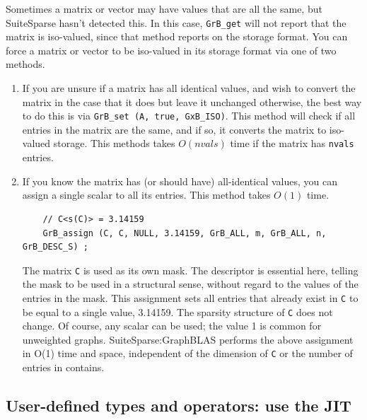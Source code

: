 Sometimes a matrix or vector may have values that are all the same, but
SuiteSparse hasn't detected this.  In this case, \verb'GrB_get' will not report
that the matrix is iso-valued, since that method reports on the storage format.
You can force a matrix or vector to be iso-valued in its storage format via one
of two methods.

\begin{enumerate}

\item If you are unsure if a matrix has all identical values, and wish to convert
the matrix in the case that it does but leave it unchanged otherwise,
the best way to do this is via \verb'GrB_set (A, true, GxB_ISO)'.
This method will check if all entries in the matrix are the same, and if so,
it converts the matrix to iso-valued storage.  This methods takes $O(nvals)$
time if the matrix has \verb'nvals' entries.

\item If you know the matrix has (or should have) all-identical values,
you can assign a single scalar to all its entries.  This method takes
$O(1)$ time.

    {\footnotesize
    \begin{verbatim}
    // C<s(C)> = 3.14159
    GrB_assign (C, C, NULL, 3.14159, GrB_ALL, m, GrB_ALL, n, GrB_DESC_S) ; \end{verbatim}}

The matrix \verb'C' is used as its own mask.  The descriptor is essential here,
telling the mask to be used in a structural sense, without regard to the values
of the entries in the mask.  This assignment sets all entries that already
exist in \verb'C' to be equal to a single value, 3.14159. The sparsity
structure of \verb'C' does not change.  Of course, any scalar can be used; the
value 1 is common for unweighted graphs.  SuiteSparse:GraphBLAS performs the
above assignment in O(1) time and space, independent of the dimension of
\verb'C' or the number of entries in contains.

\end{enumerate}

\subsection{User-defined types and operators: use the JIT}

